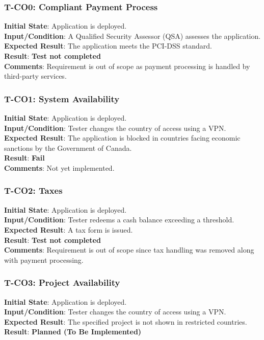 \documentclass[12pt, titlepage]{article}
\begin{document}
\subsubsection{T-CO0: Compliant Payment Process}
\textbf{Initial State}: Application is deployed.\\
\textbf{Input/Condition}: A Qualified Security Assessor (QSA) assesses the application.\\
\textbf{Expected Result}: The application meets the PCI-DSS standard.\\
\textbf{Result}: \textbf{Test not completed}\\
\textbf{Comments}: Requirement is out of scope as payment processing is handled by third-party services.

\subsubsection{T-CO1: System Availability}
\textbf{Initial State}: Application is deployed.\\
\textbf{Input/Condition}: Tester changes the country of access using a VPN.\\
\textbf{Expected Result}: The application is blocked in countries facing economic sanctions by the Government of Canada.\\
\textbf{Result}: \textbf{Fail}\\
\textbf{Comments}: Not yet implemented.

\subsubsection{T-CO2: Taxes}
\textbf{Initial State}: Application is deployed.\\
\textbf{Input/Condition}: Tester redeems a cash balance exceeding a threshold.\\
\textbf{Expected Result}: A tax form is issued.\\
\textbf{Result}: \textbf{Test not completed}\\
\textbf{Comments}: Requirement is out of scope since tax handling was removed along with payment processing.

\subsubsection{T-CO3: Project Availability}
\textbf{Initial State}: Application is deployed.\\
\textbf{Input/Condition}: Tester changes the country of access using a VPN.\\
\textbf{Expected Result}: The specified project is not shown in restricted countries.\\
\textbf{Result}: \textbf{Planned (To Be Implemented)}
\end{document}
